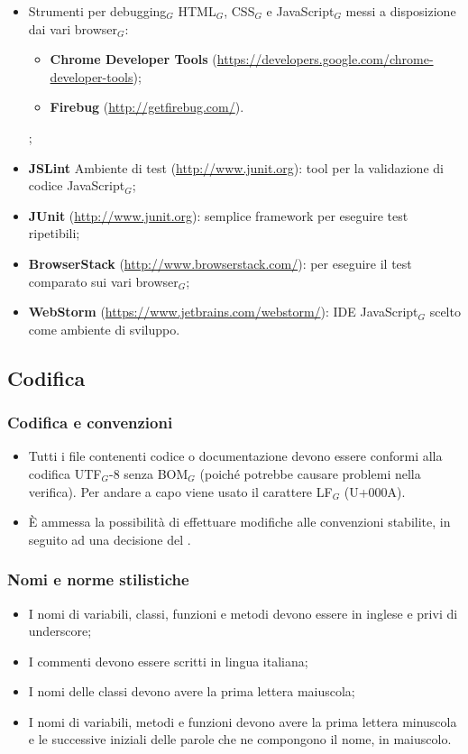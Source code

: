 \begin{itemize}
	\item Strumenti per debugging$_G$ HTML$_G$, CSS$_G$ e JavaScript$_G$ messi a disposizione dai vari browser$_G$:
	    \begin{itemize}
	    	\item \textbf{Chrome Developer Tools} (\href{https://developers.google.com/chrome-developer-tools}
	    	{https://developers.google.com/chrome-developer-tools});
	    	\item \textbf{Firebug}
	    	(\href{http://getfirebug.com/}{http://getfirebug.com/}).
	    \end{itemize};
	\item \textbf{JSLint} Ambiente di test (\href{http://www.junit.org}{http://www.junit.org}): tool per la validazione di codice JavaScript$_G$;
	\item \textbf{JUnit} (\href{http://www.junit.org}{http://www.junit.org}): semplice framework per eseguire test ripetibili;
	\item \textbf{BrowserStack} (\href{http://www.browserstack.com/}{http://www.browserstack.com/}):  per eseguire il test comparato sui vari browser$_G$;
	\item \textbf{WebStorm} (\href{https://www.jetbrains.com/webstorm/}{https://www.jetbrains.com/webstorm/}): IDE JavaScript$_G$ scelto come ambiente di sviluppo.
\end{itemize}


\subsection{Codifica}
\subsubsection{Codifica e convenzioni}
\begin{itemize}
	\item Tutti i file contenenti codice o documentazione devono essere conformi alla codifica UTF$_G$-8 senza BOM$_G$ (poiché potrebbe causare problemi nella verifica). Per andare a capo viene usato il carattere LF$_G$ (U+000A).
	\item È ammessa la possibilità di effettuare modifiche alle convenzioni stabilite, in seguito ad una decisione del \ruoloResponsabile .
\end{itemize}

\subsubsection{Nomi e norme stilistiche}
\begin{itemize}
	\item I nomi di variabili, classi, funzioni e metodi devono essere in inglese e privi di underscore;
	\item I commenti devono essere scritti in lingua italiana;
	\item I nomi delle classi devono avere la prima lettera maiuscola;
	\item I nomi di variabili, metodi e funzioni devono avere la prima lettera minuscola e le successive iniziali delle parole che ne compongono il nome, in maiuscolo.
\end{itemize}

